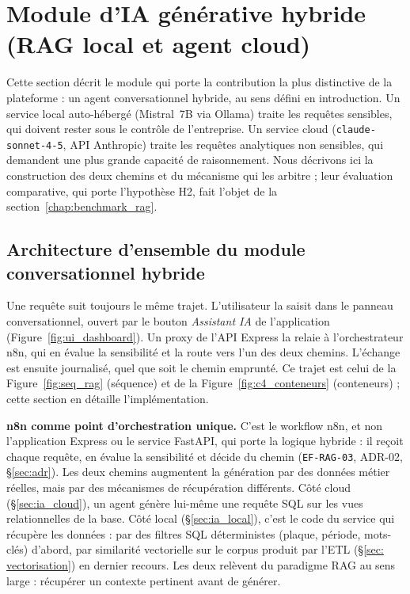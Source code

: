 \section{Module d'IA générative hybride (RAG local et agent cloud)}
\label{chap:ia_rag}

Cette section décrit le module qui porte la contribution la plus distinctive de la plateforme : un agent conversationnel hybride, au sens défini en introduction. Un service local auto-hébergé (Mistral~7B via Ollama) traite les requêtes sensibles, qui doivent rester sous le contrôle de l'entreprise. Un service cloud (\texttt{claude-sonnet-4-5}, API Anthropic) traite les requêtes analytiques non sensibles, qui demandent une plus grande capacité de raisonnement. Nous décrivons ici la construction des deux chemins et du mécanisme qui les arbitre ; leur évaluation comparative, qui porte l'hypothèse H2, fait l'objet de la section~\ref{chap:benchmark_rag}.

\subsection{Architecture d'ensemble du module conversationnel hybride}
\label{sec:ia_archi}

Une requête suit toujours le même trajet. L'utilisateur la saisit dans le panneau conversationnel, ouvert par le bouton \textit{Assistant IA} de l'application (Figure~\ref{fig:ui_dashboard}). Un proxy de l'API Express la relaie à l'orchestrateur n8n, qui en évalue la sensibilité et la route vers l'un des deux chemins. L'échange est ensuite journalisé, quel que soit le chemin emprunté. Ce trajet est celui de la Figure~\ref{fig:seq_rag} (séquence) et de la Figure~\ref{fig:c4_conteneurs} (conteneurs) ; cette section en détaille l'implémentation.

\textbf{n8n comme point d'orchestration unique.} C'est le workflow n8n, et non l'application Express ou le service FastAPI, qui porte la logique hybride : il reçoit chaque requête, en évalue la sensibilité et décide du chemin (\texttt{EF-RAG-03}, ADR-02, \S\ref{sec:adr}). Les deux chemins augmentent la génération par des données métier réelles, mais par des mécanismes de récupération différents. Côté cloud (\S\ref{sec:ia_cloud}), un agent génère lui-même une requête SQL sur les vues relationnelles de la base. Côté local (\S\ref{sec:ia_local}), c'est le code du service qui récupère les données : par des filtres SQL déterministes (plaque, période, mots-clés) d'abord, par similarité vectorielle sur le corpus produit par l'ETL (\S\ref{sec:  vectorisation}) en dernier recours. Les deux relèvent du paradigme RAG au sens large : récupérer un contexte pertinent avant de générer.

